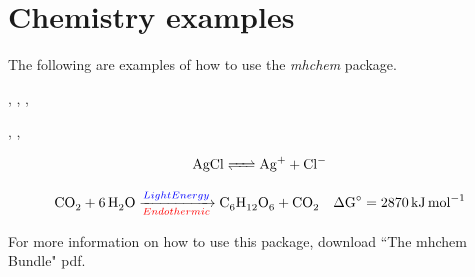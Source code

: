 \chapter{Chemistry examples}

The following are examples of how to use the \textit{mhchem} package.

, , , 





, , 

\begin{equation}
\ce{AgCl <=> Ag+ + Cl-}
\end{equation}

\begin{equation}
\ce{CO2 + 6H2O ->[\textcolor{blue}{Light Energy}][\textcolor{red}{Endothermic}] C6H12O6 + CO2 \quad \Delta G^{\circ}} = \SI{+2870}{kJ.mol^{-1}}
\end{equation}

For more information on how to use this package, download ``The mhchem Bundle" pdf. \cite{*}


%
\bibliomatter




\appendix

